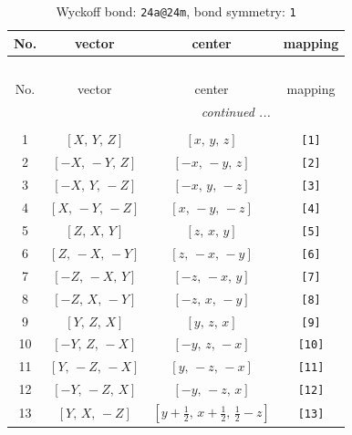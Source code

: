 \documentclass[fleqn,8pt]{jsarticle}
\begin{document}
\begin{longtable}{cccc}
\caption{Wyckoff bond: {\tt 24a@24m}, bond symmetry: {\tt 1}}
 \\
 \hline \hline
No. & vector & center & mapping \\ \hline \endfirsthead

\multicolumn{3}{l}{\tablename\ \thetable{}} \\
 \hline \hline
No. & vector & center & mapping \\ \hline \endhead

 \hline \hline
\multicolumn{3}{r}{\footnotesize\it continued ...} \\ \endfoot

 \hline \hline
\multicolumn{3}{r}{} \\ \endlastfoot

1 & $\left[ X,\, Y,\, Z \right]$ & $\left[ x,\, y,\, z \right]$ & {\tt [1]} \\ \hline
2 & $\left[ - X,\, - Y,\, Z \right]$ & $\left[ - x,\, - y,\, z \right]$ & {\tt [2]} \\ \hline
3 & $\left[ - X,\, Y,\, - Z \right]$ & $\left[ - x,\, y,\, - z \right]$ & {\tt [3]} \\ \hline
4 & $\left[ X,\, - Y,\, - Z \right]$ & $\left[ x,\, - y,\, - z \right]$ & {\tt [4]} \\ \hline
5 & $\left[ Z,\, X,\, Y \right]$ & $\left[ z,\, x,\, y \right]$ & {\tt [5]} \\ \hline
6 & $\left[ Z,\, - X,\, - Y \right]$ & $\left[ z,\, - x,\, - y \right]$ & {\tt [6]} \\ \hline
7 & $\left[ - Z,\, - X,\, Y \right]$ & $\left[ - z,\, - x,\, y \right]$ & {\tt [7]} \\ \hline
8 & $\left[ - Z,\, X,\, - Y \right]$ & $\left[ - z,\, x,\, - y \right]$ & {\tt [8]} \\ \hline
9 & $\left[ Y,\, Z,\, X \right]$ & $\left[ y,\, z,\, x \right]$ & {\tt [9]} \\ \hline
10 & $\left[ - Y,\, Z,\, - X \right]$ & $\left[ - y,\, z,\, - x \right]$ & {\tt [10]} \\ \hline
11 & $\left[ Y,\, - Z,\, - X \right]$ & $\left[ y,\, - z,\, - x \right]$ & {\tt [11]} \\ \hline
12 & $\left[ - Y,\, - Z,\, X \right]$ & $\left[ - y,\, - z,\, x \right]$ & {\tt [12]} \\ \hline
13 & $\left[ Y,\, X,\, - Z \right]$ & $\left[ y + \frac{1}{2},\, x + \frac{1}{2},\, \frac{1}{2} - z \right]$ & {\tt [13]} \\ \hline

\end{longtable}
\end{document}

